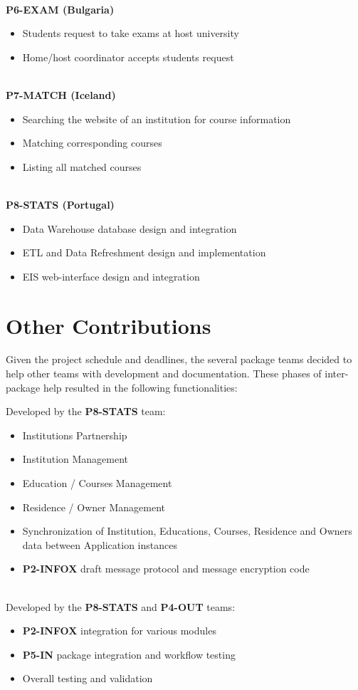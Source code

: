 \ \\
\textbf{P6-EXAM (Bulgaria)}
\begin{itemize}
  \item Students request to take exams at host university
  \item Home/host coordinator accepts students request
\end{itemize}
\ \\
\textbf{P7-MATCH (Iceland)}
\begin{itemize}
  \item Searching the website of an institution for course information
  \item Matching corresponding courses
  \item Listing all matched courses
\end{itemize}
\ \\
\textbf{P8-STATS (Portugal)}
\begin{itemize}
  \item Data Warehouse database design and integration
  \item ETL and Data Refreshment design and implementation
  \item EIS web-interface design and integration
\end{itemize}

\section{Other Contributions}
Given the project schedule and deadlines, the several package teams decided to
help other teams with development and documentation. These phases of
inter-package help resulted in the following functionalities:
\newline \newline

Developed by the \textbf{P8-STATS} team:
\begin{itemize}
  \item Institutions Partnership
  \item Institution Management
  \item Education / Courses Management
  \item Residence / Owner Management
  \item Synchronization of Institution, Educations, Courses, Residence and
  Owners data between Application instances
  \item \textbf{P2-INFOX} draft message protocol and message encryption code
\end{itemize}
\ \\
Developed by the \textbf{P8-STATS} and \textbf{P4-OUT} teams:
\begin{itemize}
  \item \textbf{P2-INFOX} integration for various modules
  \item \textbf{P5-IN} package integration and workflow testing
  \item Overall testing and validation
\end{itemize}


